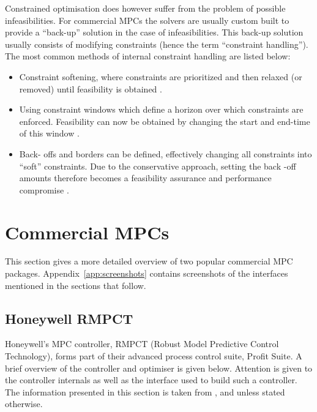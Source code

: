 Constrained optimisation does however suffer from the problem of possible infeasibilities. 
For commercial MPCs the solvers are usually custom built to provide a ``back-up'' solution in the case of infeasibilities.
This back-up solution usually consists of modifying constraints (hence the term ``constraint handling'').
The most common methods of internal constraint handling are listed below:
\begin{itemize}
\item Constraint softening, where constraints are prioritized and then relaxed (or removed) until feasibility is obtained \citep[160]{rossiter}.
\item Using constraint windows which define a horizon over which constraints are enforced.
Feasibility can now be obtained by changing the start and end-time of this window \citep[281-282]{maciejowskimpc}.
\item Back- offs and borders can be defined, effectively changing all constraints into ``soft'' constraints.
Due to the conservative approach, setting the back -off amounts therefore becomes a feasibility assurance and performance compromise .
\end{itemize}


\section{Commercial MPCs}\label{sec:commercialmpc}
This section gives a more detailed overview of two popular commercial MPC packages.
Appendix~\ref{app:screenshots} contains screenshots of the interfaces mentioned in the sections that follow.

\subsection{Honeywell RMPCT}
Honeywell's MPC controller, RMPCT (Robust Model Predictive Control Technology), forms part of their advanced process control suite, Profit Suite.
A brief overview of the controller and optimiser is given below. 
Attention is given to the controller internals as well as the interface used to build such a controller.
The information presented in this section is taken from \citet{honeywell1}, \citet{honeywell2} and \citet{honeywell3} unless stated otherwise.

